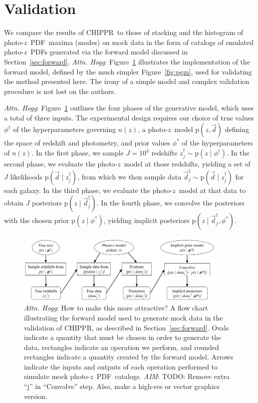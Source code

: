 \documentclass[iop]{emulateapj}
\newcommand{\todo}[3]{{\color{#2}\emph{#1}: #3}}
\newcommand{\aim}[1]{\todo{AIM}{red}{#1}}
\newcommand{\dwh}[1]{\todo{Attn. Hogg}{blue}{#1}}
\newcommand{\Sect}[1]{Section~\ref{#1}}
\newcommand{\Fig}[1]{Figure~\ref{#1}}
\newcommand{\project}[1]{\textsc{#1}}
\newcommand{\Chippr}{\project{CHIPPR}}%
\newcommand{\data}{\ensuremath{\vec{d}}}%
\newcommand{\pr}[1]{\ensuremath{\mathrm{p}(#1)}}%
\newcommand{\gvn}{\mid}%
\newcommand{\pz}{photo-$z$}
\newcommand{\pzpdf}{\pz\ PDF}%
\newcommand{\nz}{$n(z)$}
\begin{document}
\section{Validation}
\label{sec:alldata}

We compare the results of \Chippr\ to those of stacking and the histogram of \pzpdf\ maxima (modes) on mock data in the form of catalogs of emulated \pzpdf s generated via the forward model discussed in \Sect{sec:forward}.
\dwh{\Fig{fig:flowchart} illustrates the implementation of the forward model, defined by the much simpler \Fig{fig:pgm}, used for validating the method presented here.
The irony of a simple model and complex validation procedure is not lost on the authors.}

\dwh{\Fig{fig:flowchart} outlines the four phases of the generative model, which uses a total of three inputs.
The experimental design requires our choice of true values $\phi^{\dagger}$ of the hyperparameters governing \nz, a \pz\ model $\pr{z, \data}$ defining the space of redshift and photometry, and prior values $\phi^{*}$ of the hyperparameters of \nz.
In the first phase, we sample $J = 10^{4}$ redshifts $z_{j}^{\dagger} \sim \pr{z \gvn \phi^{\dagger}}$.
In the second phase, we evaluate the \pz\ model at those redshifts, yielding a set of $J$ likelihoods $\pr{\data \gvn z_{j}^{\dagger}}$, from which we then sample data $\data_{j}^{\dagger} \sim \pr{\data \gvn z_{j}^{\dagger}}$ for each galaxy.
In the third phase, we evaluate the \pz\ model at that data to obtain $J$ posteriors $\pr{z \gvn \data_{j}^{\dagger}}$.
In the fourth phase, we convolve the posteriors with the chosen prior $\pr{z \gvn \phi^{*}}$, yielding implicit posteriors $\pr{z \gvn \data_{j}^{\dagger}, \phi^{*}}$.}

\begin{figure}
	\begin{center}
		\includegraphics[width=0.9\textwidth]{figures/chippr/flowchart.png}
		\caption{
			\dwh{How to make this more attractive?}
			A flow chart illustrating the forward model used to generate mock data in the validation of \Chippr, as described in \Sect{sec:forward}.
			Ovals indicate a quantity that must be chosen in order to generate the data, rectangles indicate an operation we perform, and rounded rectangles indicate a quantity created by the forward model.
			Arrows indicate the inputs and outputs of each operation performed to simulate mock \pzpdf\ catalogs.
			\aim{TODO: Remove extra ``j'' in ``Convolve'' step.
			Also, make a high-res or vector graphics version.}
			}
		\label{fig:flowchart}
	\end{center}
\end{figure}
\end{document}
